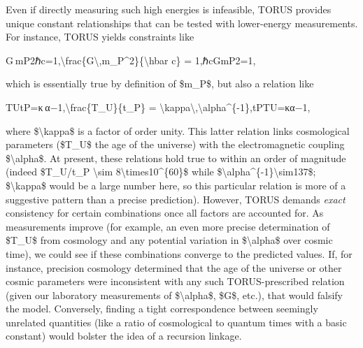 \documentclass[
]{article}
\begin{document}
Even if directly measuring such high energies is infeasible, TORUS
provides unique constant relationships that can be tested with
lower-energy measurements. For instance, TORUS yields constraints like

G mP2ℏc=1,\textbackslash frac\{G\textbackslash,m\_P\^{}2\}\{\textbackslash hbar
c\} = 1,ℏcGmP2\hspace{0pt}\hspace{0pt}=1,

which is essentially true by definition of \$m\_P\$, but also a relation
like

TUtP=κ α−1,\textbackslash frac\{T\_U\}\{t\_P\} =
\textbackslash kappa\textbackslash,\textbackslash alpha\^{}\{-1\},tP\hspace{0pt}TU\hspace{0pt}\hspace{0pt}=κα−1,

where \$\textbackslash kappa\$ is a factor of order unity. This latter
relation links cosmological parameters (\$T\_U\$ the age of the
universe) with the electromagnetic coupling \$\textbackslash alpha\$. At
present, these relations hold true to within an order of magnitude
(indeed \$T\_U/t\_P \textbackslash sim
8\textbackslash times10\^{}\{60\}\$ while
\$\textbackslash alpha\^{}\{-1\}\textbackslash sim137\$;
\$\textbackslash kappa\$ would be a large number here, so this
particular relation is more of a suggestive pattern than a precise
prediction). However, TORUS demands \emph{exact} consistency for certain
combinations once all factors are accounted for. As measurements improve
(for example, an even more precise determination of \$T\_U\$ from
cosmology and any potential variation in \$\textbackslash alpha\$ over
cosmic time), we could see if these combinations converge to the
predicted values. If, for instance, precision cosmology determined that
the age of the universe or other cosmic parameters were inconsistent
with any such TORUS-prescribed relation (given our laboratory
measurements of \$\textbackslash alpha\$, \$G\$, etc.), that would
falsify the model. Conversely, finding a tight correspondence between
seemingly unrelated quantities (like a ratio of cosmological to quantum
times with a basic constant) would bolster the idea of a recursion
linkage.
\end{document}

